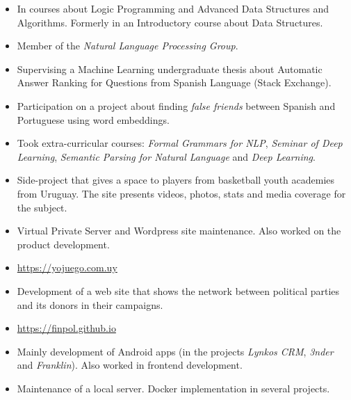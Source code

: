 \documentclass[10pt,a4paper,academicons]{altacv}
\begin{document}
\begin{itemize}
  \item In courses about Logic Programming and Advanced Data Structures and Algorithms. Formerly in an Introductory course about Data Structures.
  \item Member of the \emph{Natural Language Processing Group}.
  \item Supervising a Machine Learning undergraduate thesis about Automatic Answer Ranking for Questions from Spanish Language (Stack Exchange).
  \item Participation on a project about finding \emph{false friends} between Spanish and Portuguese using word embeddings.
  \item Took extra-curricular courses: \emph{Formal Grammars for NLP}, \emph{Seminar of Deep Learning}, \emph{Semantic Parsing for Natural Language} and \emph{Deep Learning}.
\end{itemize}

\divider{}


\begin{itemize}
  \item Side-project that gives a space to players from basketball youth academies from Uruguay. The site presents videos, photos, stats and media coverage for the subject.
  \item Virtual Private Server and Wordpress site maintenance. Also worked on the product development.
  \item \url{https://yojuego.com.uy}
\end{itemize}

\divider{}


\begin{itemize}
  \item Development of a web site that shows the network between political parties and its donors in their campaigns.
  \item \url{https://finpol.github.io}
\end{itemize}

\divider{}


\begin{itemize}
  \item Mainly development of Android apps (in the projects \emph{Lynkos CRM}, \emph{3nder} and \emph{Franklin}). Also worked in frontend development.
  \item Maintenance of a local server. Docker implementation in several projects.
\end{itemize}
\end{document}
